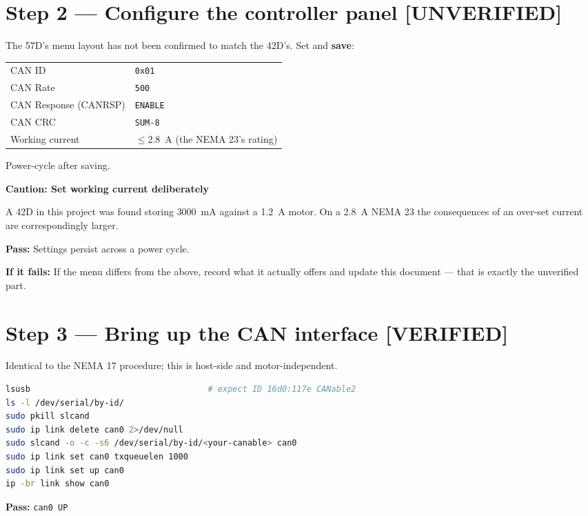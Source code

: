 \documentclass[11pt,letterpaper]{article}
\newenvironment{caution}[1]{%
    \par\addvspace{8pt}%
    \noindent{\color{cautionred}\rule{\linewidth}{0.8pt}}\par\vspace{2pt}
    \noindent\textbf{\color{cautionred}Caution: #1}\par\vspace{2pt}
}{%
    \par\vspace{2pt}\noindent{\color{cautionred}\rule{\linewidth}{0.4pt}}%
    \par\addvspace{8pt}%
}
\newcommand{\verified}{{\color{okgreen}\textbf{[VERIFIED]}}}
\newcommand{\unverified}{{\color{unverifiedorange}\textbf{[UNVERIFIED]}}}
\newcommand{\passif}[1]{\par\vspace{2pt}\noindent\textbf{\color{okgreen}Pass:} #1\par\vspace{4pt}}
\newcommand{\failif}[1]{\noindent\textbf{If it fails:} #1\par\vspace{6pt}}
\begin{document}
\section*{Step 2 --- Configure the controller panel \unverified}
The 57D's menu layout has not been confirmed to match the 42D's. Set and \textbf{save}:

\begin{table}[h]
\centering
\begin{tabular}{ll}
\toprule
CAN ID & \texttt{0x01} \\
CAN Rate & \texttt{500} \\
CAN Response (CANRSP) & \texttt{ENABLE} \\
CAN CRC & \texttt{SUM-8} \\
Working current & $\leq 2.8$~A (the NEMA 23's rating) \\
\bottomrule
\end{tabular}
\end{table}

Power-cycle after saving.

\begin{caution}{Set working current deliberately}
A 42D in this project was found storing 3000~mA against a 1.2~A motor. On a 2.8~A
NEMA 23 the consequences of an over-set current are correspondingly larger.
\end{caution}
\passif{Settings persist across a power cycle.}
\failif{If the menu differs from the above, record what it actually offers and update
this document --- that is exactly the unverified part.}

\section*{Step 3 --- Bring up the CAN interface \verified}
Identical to the NEMA 17 procedure; this is host-side and motor-independent.
\begin{lstlisting}[language=bash]
lsusb                                    # expect ID 16d0:117e CANable2
ls -l /dev/serial/by-id/
sudo pkill slcand
sudo ip link delete can0 2>/dev/null
sudo slcand -o -c -s6 /dev/serial/by-id/<your-canable> can0
sudo ip link set can0 txqueuelen 1000
sudo ip link set up can0
ip -br link show can0
\end{lstlisting}
\passif{\texttt{can0 \quad UP}}
\end{document}
